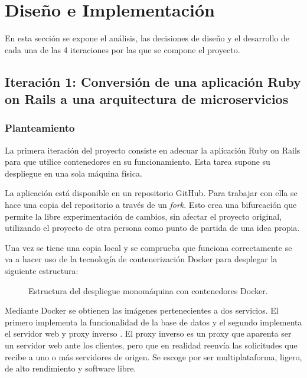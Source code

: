 \chapter{Diseño e Implementación}
\label{cha:regulation}

En esta sección se expone el análisis, las decisiones de diseño y el desarrollo de cada una de las 4 iteraciones por las que se compone el proyecto.

\section{Iteración 1: Conversión de una aplicación Ruby on Rails a una arquitectura de microservicios}

\subsection{Planteamiento}

La primera iteración del proyecto consiste en adecuar la aplicación Ruby on Rails para que utilice contenedores en su funcionamiento. Esta tarea supone su despliegue en una sola máquina física.

La aplicación  está disponible en un repositorio GitHub. Para trabajar con ella se hace una copia del repositorio a través de un \textit{fork}. Esto crea una bifurcación que permite la libre experimentación de cambios, sin afectar el proyecto original, utilizando el proyecto de otra persona como punto de partida de una idea propia.

Una vez se tiene una copia local y se comprueba que funciona correctamente se va a hacer uso de la tecnología de contenerización Docker para desplegar la siguiente estructura:

\begin{figure}[H]
\caption{Estructura del despliegue monomáquina con contenedores Docker.\label{fig:figure_docker_microservices}}
\end{figure}

Mediante Docker se obtienen las imágenes pertenecientes a dos servicios. El primero implementa la funcionalidad de la base de datos  y el segundo implementa el servidor web y proxy inverso . El proxy inverso es un proxy que aparenta ser un servidor web ante los clientes, pero que en realidad reenvía las solicitudes que recibe a uno o más servidores de origen. Se escoge  por ser multiplataforma, ligero, de alto rendimiento y software libre.

